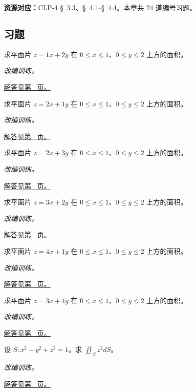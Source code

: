 \documentclass[12pt,fontset=fandol]{ctexart}
\begin{document}
\textbf{资源对应：}CLP-4 \S~3.3、\S~4.1--\S~4.4。本章共 24 道编号习题。
\subsection{习题}
\begin{example}[图形曲面的面积]\label{ex:c43q1}
求平面片 $z=1x+2y$ 在 $0\le x\le1$、$0\le y\le2$ 上方的面积。
\par\textit{改编训练。}\par\hyperref[ans:c43q1]{解答见第~\pageref{ans:c43q1} 页。}
\end{example}
\begin{example}[图形曲面的面积]\label{ex:c43q2}
求平面片 $z=2x+1y$ 在 $0\le x\le1$、$0\le y\le2$ 上方的面积。
\par\textit{改编训练。}\par\hyperref[ans:c43q2]{解答见第~\pageref{ans:c43q2} 页。}
\end{example}
\begin{example}[图形曲面的面积]\label{ex:c43q3}
求平面片 $z=2x+3y$ 在 $0\le x\le1$、$0\le y\le2$ 上方的面积。
\par\textit{改编训练。}\par\hyperref[ans:c43q3]{解答见第~\pageref{ans:c43q3} 页。}
\end{example}
\begin{example}[图形曲面的面积]\label{ex:c43q4}
求平面片 $z=3x+2y$ 在 $0\le x\le1$、$0\le y\le2$ 上方的面积。
\par\textit{改编训练。}\par\hyperref[ans:c43q4]{解答见第~\pageref{ans:c43q4} 页。}
\end{example}
\begin{example}[图形曲面的面积]\label{ex:c43q5}
求平面片 $z=4x+1y$ 在 $0\le x\le1$、$0\le y\le2$ 上方的面积。
\par\textit{改编训练。}\par\hyperref[ans:c43q5]{解答见第~\pageref{ans:c43q5} 页。}
\end{example}
\begin{example}[图形曲面的面积]\label{ex:c43q6}
求平面片 $z=3x+4y$ 在 $0\le x\le1$、$0\le y\le2$ 上方的面积。
\par\textit{改编训练。}\par\hyperref[ans:c43q6]{解答见第~\pageref{ans:c43q6} 页。}
\end{example}
\begin{example}[球面的二次函数积分]\label{ex:c43q7}
设 $S:x^2+y^2+z^2=1$。求 $\displaystyle\iint_Sz^2dS$。
\par\textit{改编训练。}\par\hyperref[ans:c43q7]{解答见第~\pageref{ans:c43q7} 页。}
\end{example}
\end{document}
